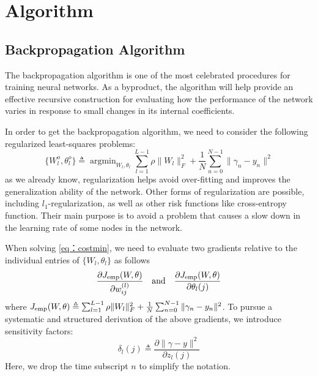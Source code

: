 \documentclass[journal,a4paper,onecolumn,11pt]{IEEEtran}
\begin{document}
\section{Algorithm} \label{Algorithm}
\subsection{Backpropagation Algorithm}
The backpropagation algorithm is one of the most celebrated procedures for training neural networks. As a byproduct, the algorithm will help provide an effective recursive construction for evaluating how the performance of the network varies in response to small changes in its internal coefficients.

In order to get the backpropagation algorithm, we need to consider the following regularized least-squares problems:
\begin{equation}
\label{eq：costmin}
\{W_l^o, \theta_l^o\} \triangleq \mathop{\arg\min}_{W_l,\theta_l} \sum_{l=1}^{L-1} \rho \| W_l\|_F^2 + \frac{1}{N} \sum_{n=0}^{N-1} \| \gamma_n - y_n \|^2
\end{equation}
as we already know, regularization helps avoid over-fitting and improves the generalization ability of the network. Other forms of regularization are possible, including $l_1$-regularization, as well as other risk functions like cross-entropy function. Their main purpose is to avoid a problem that causes a slow down in the learning rate of some nodes in the network.

When solving \eqref{eq：costmin}, we need to evaluate two gradients relative to the individual entries of $\{W_l, \theta_l\}$ as follows
\begin{equation}
\label{eq:gradient}
\frac{\partial J_{\rm{emp}}(W,\theta)}{\partial w_{ij}^{(l)}} \quad \text{and} \quad \frac{\partial J_{\rm{emp}}(W,\theta)}{\partial \theta_{l}(j)}
\end{equation}
where $J_{\rm{emp}}(W,\theta) \triangleq \sum_{l=1}^{L-1} \rho \| W_l\|_F^2 + \frac{1}{N} \sum_{n=0}^{N-1} \| \gamma_n - y_n \|^2$. To pursue a systematic and structured derivation of the above gradients, we introduce sensitivity factors:
\begin{equation}
\delta_l(j) \triangleq \frac{\partial \|\gamma-y\|^2}{\partial z_l(j)}
\end{equation}
Here, we drop the time subscript $n$ to simplify the notation.
\end{document}
